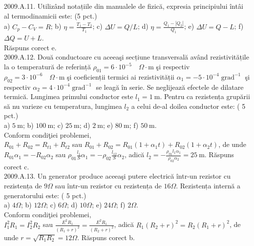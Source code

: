 2009.A.11. Utilizând notațiile din manualele de fizică, expresia principiului întâi al termodinamicii este: (5 pct.)\\ a) $C_{p}-C_{V}=R$; b) $\eta=\frac{T_{1}-T_{2}}{T_{1}}$; c) $\Delta U=Q / L$; d) $\eta=\frac{Q_{1}-\left|Q_{2}\right|}{Q_{1}}$; e) $\Delta U=Q-L$; f) $\Delta Q=U+L$.\\ Răspuns corect e.\\

2009.A.12. Două conductoare cu aceeaşi secțiune transversală având rezistivitățile la o temperatură de referință $\rho_{01}=6 \cdot 10^{-5} \quad \Omega \cdot \mathrm{m}$ şi respectiv $\rho_{02}=3 \cdot 10^{-6} \quad \Omega \cdot \mathrm{m}$ şi coeficienții termici ai rezistivității $\alpha_{1}=-5 \cdot 10^{-4} \operatorname{grad}^{-1}$ şi respectiv $\alpha_{2}=4 \cdot 10^{-4} \operatorname{grad}^{-1}$ se leagă în serie. Se neglijează efectele de dilatare termică. Lungimea primului conductor este $l_{1}=1 \mathrm{~m}$. Pentru ca rezistența grupării să nu varieze cu temperatura, lungimea $l_{2}$ a celui de-al doilea conductor este: ( 5 pct.)\\ a) $5 \mathrm{~m}$; b) $100 \mathrm{~m}$; c) $25 \mathrm{~m}$; d) $2 \mathrm{~m}$; e) $80 \mathrm{~m}$; f) $50 \mathrm{~m}$.\\ Conform condiţiei problemei,\\ $R_{01}+R_{02}=R_{t 1}+R_{t 2}$ sau $R_{01}+R_{02}=R_{01}\left(1+\alpha_{1} t\right)+R_{02}\left(1+\alpha_{2} t\right)$, de unde $R_{01} \alpha_{1}=-R_{02} \alpha_{2}$ sau $\rho_{01} \frac{l_{1}}{S} \alpha_{1}=-\rho_{02} \frac{l_{12}}{S} \alpha_{2}$, adică $l_{2}=-\frac{\rho_{01} l_{1} \alpha_{1}}{\rho_{02} \alpha_{2}}=25 \mathrm{~m}$. Răspuns corect c.\\

2009.A.13. Un generator produce aceeaşi putere electrică într-un rezistor cu rezistența de $9 \Omega$ sau într-un rezistor cu rezistența de $16 \Omega$. Rezistența internă a generatorului este: ( 5 pct.)\\ a) $4 \Omega$; b) $12 \Omega$; c) $6 \Omega$; d) $10 \Omega$; e) $24 \Omega$; f) $2 \Omega$.\\ Conform condiţiei problemei,\\ $I_{1}^{2} R_{1}=I_{2}^{2} R_{2}$ sau $\frac{E^{2} R_{1}}{\left(R_{1}+r\right)^{2}}=\frac{E^{2} R_{1}}{\left(R_{2}+r\right)^{2}}$, adică $R_{1}\left(R_{2}+r\right)^{2}=R_{2}\left(R_{1}+r\right)^{2}$, de unde $r=\sqrt{R_{1} R_{2}}=12 \Omega$. Răspuns corect b.\\

